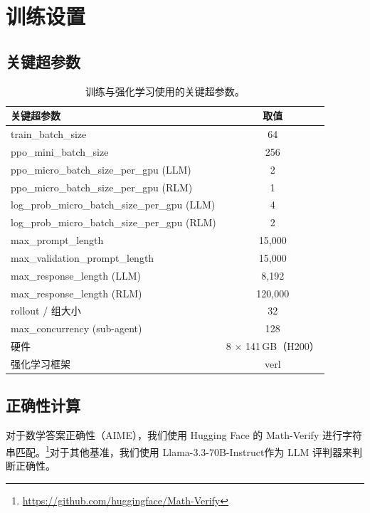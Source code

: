 \section{训练设置}
\label{ap:training_setup}


\subsection{关键超参数}


\begin{table}[h]
\centering
\small
\begin{tabular}{l c}
\toprule
\textbf{关键超参数} & \textbf{取值} \\
\midrule
train\_batch\_size & 64 \\
ppo\_mini\_batch\_size & 256 \\
ppo\_micro\_batch\_size\_per\_gpu (LLM) & 2 \\
ppo\_micro\_batch\_size\_per\_gpu (RLM) & 1 \\
log\_prob\_micro\_batch\_size\_per\_gpu (LLM) & 4 \\
log\_prob\_micro\_batch\_size\_per\_gpu (RLM) & 2 \\
max\_prompt\_length & 15{,}000 \\
max\_validation\_prompt\_length & 15{,}000 \\
max\_response\_length (LLM) & 8{,}192 \\
max\_response\_length (RLM) & 120{,}000 \\
rollout / 组大小 & 32 \\
max\_concurrency (sub-agent) & 128 \\
硬件 & 8 $\times$ 141\,GB（H200）\\
强化学习框架 & verl \\
\bottomrule
\end{tabular}
\caption{训练与强化学习使用的关键超参数。}
\label{tab:hyperparameters}
\end{table}

\subsection{正确性计算}

对于数学答案正确性（AIME），我们使用 Hugging Face 的 Math-Verify 进行字符串匹配。\footnote{\url{https://github.com/huggingface/Math-Verify}}对于其他基准，我们使用 Llama-3.3-70B-Instruct\cite{grattafiori2024llama3herdmodels}作为 LLM 评判器来判断正确性。


